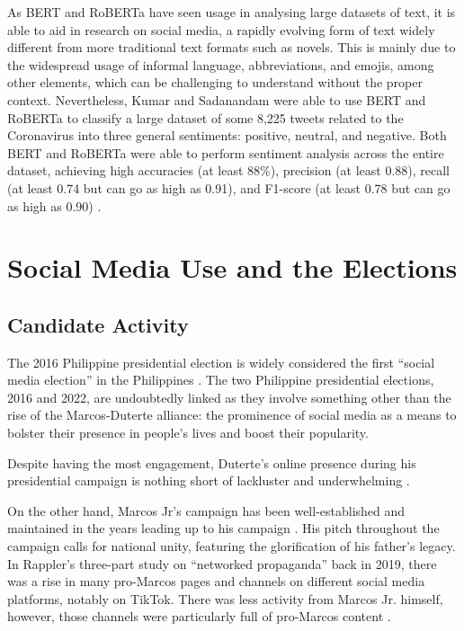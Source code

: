As BERT and RoBERTa have seen usage in analysing large datasets of text, it is able to aid in research on social media, a rapidly evolving form of text widely different from more traditional text formats such as novels. This is mainly due to the widespread usage of informal language, abbreviations, and emojis, among other elements, which can be challenging to understand without the proper context. Nevertheless, Kumar and Sadanandam were able to use BERT and RoBERTa to classify a large dataset of some 8,225 tweets related to the Coronavirus into three general sentiments: positive, neutral, and negative. Both BERT and RoBERTa were able to perform sentiment analysis across the entire dataset, achieving high accuracies (at least 88\%), precision (at least 0.88), recall (at least 0.74 but can go as high as 0.91), and F1-score (at least 0.78 but can go as high as 0.90) \cite{RRL_Pranay-Kumar-2023}.

\section{Social Media Use and the Elections}
\subsection{Candidate Activity}
The 2016 Philippine presidential election is widely considered the first “social media election” in the Philippines \cite{RRL_Sinpeng-2020}. The two Philippine presidential elections, 2016 and 2022, are undoubtedly linked as they involve something other than the rise of the Marcos-Duterte alliance: the prominence of social media as a means to bolster their presence in people’s lives and boost their popularity.

Despite having the most engagement, Duterte’s online presence during his presidential campaign is nothing short of lackluster and underwhelming \cite{RRL_Sinpeng-2020}.

On the other hand, Marcos Jr’s campaign has been well-established and maintained in the years leading up to his campaign \cite{RRL_Mendoza-2022}. His pitch throughout the campaign calls for national unity, featuring the glorification of his father’s legacy. In Rappler’s three-part study on “networked propaganda” back in 2019, there was a rise in many pro-Marcos pages and channels on different social media platforms, notably on TikTok. There was less activity from Marcos Jr. himself, however, those channels were particularly full of pro-Marcos content \cite{RRL_Mendoza-2022}.

